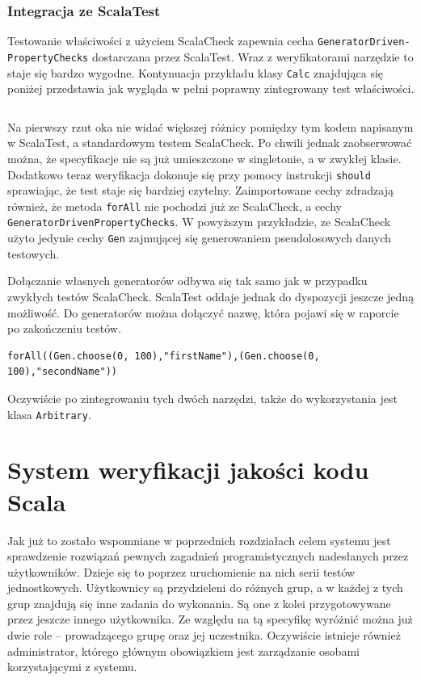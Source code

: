 \documentclass[brudnopis]{xmgr}
\begin{document}
\subsection{Integracja ze ScalaTest}

Testowanie właściwości z użyciem ScalaCheck zapewnia cecha \texttt{GeneratorDriven-\newline PropertyChecks} dostarczana przez ScalaTest. Wraz z weryfikatorami narzędzie to staje się bardzo wygodne. Kontynuacja przykładu klasy \texttt{Calc} znajdująca się poniżej przedstawia jak wygląda w pełni poprawny zintegrowany test właściwości. 

\inputminted[fontsize=\small]{scala}{code/CalcTestScalaTest.scala}

Na pierwszy rzut oka nie widać większej różnicy pomiędzy tym kodem napisanym w ScalaTest, a standardowym testem ScalaCheck. Po chwili jednak zaobserwować można, że specyfikacje nie są już umieszczone w singletonie, a w zwykłej klasie. Dodatkowo teraz weryfikacja dokonuje się przy pomocy instrukcji \texttt{should} sprawiając, że test staje się bardziej czytelny. Zaimportowane cechy zdradzają również, że metoda \texttt{forAll} nie pochodzi już ze ScalaCheck, a cechy \texttt{GeneratorDrivenPropertyChecks}. W powyższym przykładzie, ze ScalaCheck użyto jedynie cechy \texttt{Gen} zajmującej się generowaniem pseudolosowych danych testowych.

Dołączanie własnych generatorów odbywa się tak samo jak w przypadku zwykłych testów ScalaCheck. ScalaTest oddaje jednak do dyspozycji jeszcze jedną możliwość. Do generatorów można dołączyć nazwę, która pojawi się w raporcie po zakończeniu testów.

\begin{verbatim}
forAll((Gen.choose(0, 100),"firstName"),(Gen.choose(0, 100),"secondName"))
\end{verbatim}

Oczywiście po zintegrowaniu tych dwóch narzędzi, także do wykorzystania jest klasa \texttt{Arbitrary}.

\chapter{System weryfikacji jakości kodu Scala}

Jak już to zostało wspomniane w poprzednich rozdziałach celem systemu jest sprawdzenie rozwiązań pewnych zagadnień programistycznych nadesłanych przez użytkowników. Dzieje się to poprzez uruchomienie na nich serii testów jednostkowych. Użytkownicy są przydzieleni do różnych grup, a w każdej z tych grup znajdują się inne zadania do wykonania. Są one z kolei przygotowywane przez jeszcze innego użytkownika. Ze względu na tą specyfikę wyróżnić można już dwie role -- prowadzącego grupę oraz jej uczestnika. Oczywiście istnieje również administrator, którego głównym obowiązkiem jest zarządzanie osobami korzystającymi z systemu.
\end{document}
